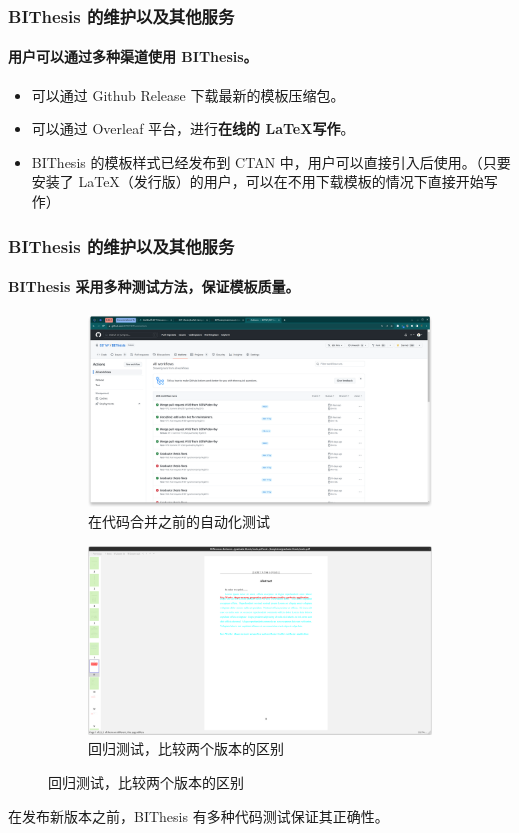\documentclass[
  aspectratio=169,
  presentation,
  titlegraphic=./images/bit.png,
  framelogo=./images/bit.png
]{bitbeamer}
\begin{document}
\begin{frame}[t]
  \frametitle{BIThesis 的维护以及其他服务}
  \framesubtitle{用户可以通过\textbf{多种渠道}使用 BIThesis。}

\begin{itemize}
  \item 可以通过 Github Release 下载最新的模板压缩包。
  \item 可以通过 Overleaf 平台，进行\textbf{在线的 \LaTeX 写作}。
  \item BIThesis 的模板样式已经发布到 CTAN 中，用户可以直接引入后使用。（只要安装了 \LaTeX （发行版）的用户，可以在不用下载模板的情况下直接开始写作）
\end{itemize}
\end{frame}

\begin{frame}[c]
  \frametitle{BIThesis 的维护以及其他服务}
  \framesubtitle{BIThesis 采用多种测试方法，保证模板质量。}

\begin{figure}
    \centering
    \begin{subfigure}{0.49\textwidth}
      \includegraphics[width=\textwidth]{images/2.png}
      \caption{在代码合并之前的自动化测试}\label{fig:1-1}
  \end{subfigure}
  \begin{subfigure}{0.49\textwidth}
      \includegraphics[width=\textwidth]{images/3.png}
      \caption{回归测试，比较两个版本的区别}\label{fig:1-2}
  \end{subfigure}
  \end{figure}
  
在发布新版本之前，BIThesis 有多种代码测试保证其正确性。
\end{frame}
\end{document}
